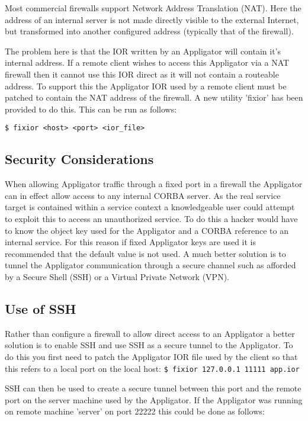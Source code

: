 Most commercial firewalls support Network Address Translation (NAT).
Here the address of an internal server is not made directly visible to
the external Internet, but transformed into another configured address
(typically that of the firewall).

The problem here is that the IOR written by an Appligator will contain
it's internal address. If a remote client wishes to access this
Appligator via a NAT firewall then it cannot use this IOR direct as it
will not contain a routeable address. To support this the Appligator
IOR used by a remote client must be patched to contain the NAT address
of the firewall. A new utility 'fixior' has been provided to do
this. This can be run as follows:

\verb+$ fixior <host> <port> <ior_file>+

\subsection{Security Considerations}

When allowing Appligator traffic through a fixed port in a firewall
the Appligator can in effect allow access to any internal CORBA
server. As the real service target is contained within a service
context a knowledgeable user could attempt to exploit this to access
an unauthorized service. To do this a hacker would have to know the
object key used for the Appligator and a CORBA reference to an
internal service. For this reason if fixed Appligator keys are used it
is recommended that the default value is not used. A much better
solution is to tunnel the Appligator communication through a secure
channel such as afforded by a Secure Shell (SSH) or a Virtual Private
Network (VPN).

\subsection{Use of SSH}

Rather than configure a firewall to allow direct access to an
Appligator a better solution is to enable SSH and use SSH as a secure
tunnel to the Appligator. To do this you first need to patch the
Appligator IOR file used by the client so that this refers to a local
port on the local host:
\verb+$ fixior 127.0.0.1 11111 app.ior+

SSH can then be used to create a secure tunnel between this port and
the remote port on the server machine used by the Appligator. If the
Appligator was running on remote machine 'server' on port 22222 this
could be done as follows:

